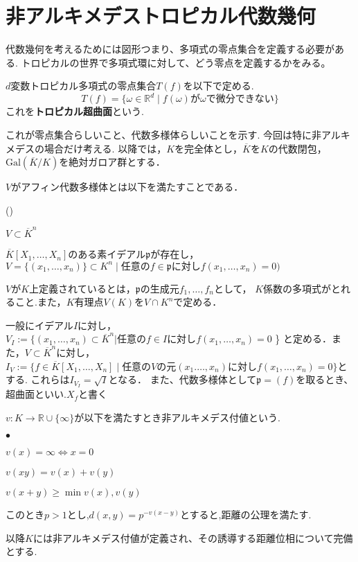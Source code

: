 \documentclass{ujarticle}
\renewenvironment{itemize}%
{%
   \begin{list}{\parbox{1zw}{$\bullet$}}%
   {%
      \setlength{\topsep}{0zh}
      \setlength{\itemindent}{0zw}
      \setlength{\leftmargin}{2zw}%
      \setlength{\rightmargin}{0zw}%
      \setlength{\labelsep}{1zw}%
      \setlength{\labelwidth}{3zw}%
      \setlength{\itemsep}{0em}%
      \setlength{\parsep}{0em}%
      \setlength{\listparindent}{0zw}%
   }
}{%
   \end{list}%
}
\renewenvironment{enumerate}
{
\begin{list}{(\arabic{enumi})}
{
\usecounter{enumi}
\setlength{\topsep}{0zh}
\setlength{\itemindent}{0zw}
\setlength{\leftmargin}{2zw} %
\setlength{\rightmargin}{0zw} %
\setlength{\labelsep}{1zw} %
\setlength{\labelwidth}{3zw} %
\setlength{\itemsep}{0em} %
\setlength{\parsep}{0em} %
\setlength{\listparindent}{1zw} %
}
}{
\end{list}
}
\begin{document}
\section{非アルキメデストロピカル代数幾何}
代数幾何を考えるためには図形つまり、多項式の零点集合を定義する必要がある.
トロピカルの世界で多項式環に対して、どう零点を定義するかをみる。

\begin{dfn}
$d$変数トロピカル多項式の零点集合$T(f)$を以下で定める.
\begin{equation*}
  T(f) = \{ \omega \in \mathbb{R}^d \mid f(\omega) \mbox{が}\omega\mbox{で微分できない} \}
\end{equation*}
これを\textbf{トロピカル超曲面}という.
\end{dfn}
これが零点集合らしいこと、代数多様体らしいことを示す.
今回は特に非アルキメデスの場合だけ考える.
以降では，$K$を完全体とし，$\overline{K}$を$K$の代数閉包，$\mathrm{Gal}(\overline{K}/K)$を絶対ガロア群とする．
\begin{dfn}
$V$がアフィン代数多様体とは以下を満たすことである．
\begin{enumerate}
  \item $V \subset \overline{K}^n$
  \item $\overline{K}[X_1,\dots,X_n]$のある素イデアル$\mathfrak{p}$が存在し，
           $V = \{ (x_1, \dots,x_n) \} \subset K^n \mid
           \mbox{任意の} f \in \mathfrak{p} \mbox{に対し}f(x_1,\dots,x_n)=0)$
\end{enumerate}
\end{dfn}
\begin{dfn}
  $V$が$K$上定義されているとは，$\mathfrak{p}$の生成元$f_1,\dots,f_n$として，
  $K$係数の多項式がとれること.また，$K$有理点$V(K)$を$V \cap K^n$で定める．
\end{dfn}

一般にイデアル$I$に対し，
$V_I:=\{ (x_1,\dots,x_n)  \subset \overline{K}^n |
\mbox{任意の}f \in I \mbox{に対し} f(x_1,\dots,x_n)=0$ \}
と定める．また，$V \subset \overline{K}^n$に対し，
$I_V:=\{ f \in \overline{K}[X_1,\dots,X_n] \mid \mbox{任意の}V
\mbox{の元}(x_1.\dots,x_n)\mbox{に対し}f(x_1,\dots,x_n)=0 \} $とする.
これらは$I_{V_I}=\sqrt{I}$となる．
また、代数多様体として$\mathfrak{p}=(f)$を取るとき、超曲面といい.$X_f$と書く
\begin{dfn}
 $v : K \to \mathbb{R} \cup \{\infty\}$が以下を満たすとき非アルキメデス付値という.
 \begin{itemize}
   \item $v(x) = \infty \Leftrightarrow x = 0$
   \item $v(xy) = v(x) + v(y)$
   \item $v(x + y) \ge \min{v(x),v(y)}$
 \end{itemize}
\end{dfn}
\begin{rem}
 このとき$p >1$とし,$d(x,y) = p^{-v(x-y)}$とすると,距離の公理を満たす.
\end{rem}
以降$K$には非アルキメデス付値が定義され、その誘導する距離位相について完備とする.
\end{document}
